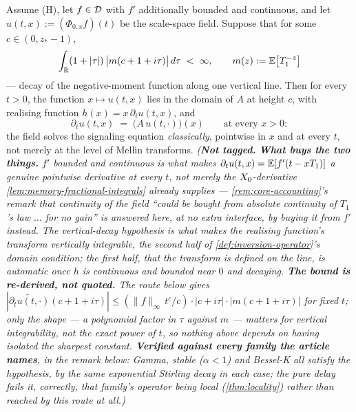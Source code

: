 \begin{corollary}\label{cor:signaling-classical}
Assume (H), let $f \in \mathcal{D}$ with $f'$ additionally bounded and continuous, and let
$u(t,x) := (\Phi_{0,x}f)(t)$ be the scale-space field. Suppose that for some $c \in (0,z_*-1)$,
\[
\int_{\mathbb{R}} (1+|\tau|)\,\bigl|m(c+1+i\tau)\bigr|\,d\tau \;<\; \infty, \qquad m(z) := \mathbb{E}\bigl[T_1^{-z}\bigr]
\]
--- decay of the negative-moment function along one vertical line. Then for every $t > 0$, the
function $x \mapsto u(t,x)$ lies in the domain of $A$ at height $c$, with realising function
$h(x) = x\,\partial_t u(t,x)$, and
\[
\partial_t u(t,x) \;=\; \bigl(A\,u(t,\cdot)\bigr)(x) \qquad \text{at every } x > 0:
\]
the field solves the signaling equation \emph{classically}, pointwise in $x$ and at every $t$, not
merely at the level of Mellin transforms.
\statusT\quad\emph{(\textbf{Not tagged.} \textbf{What buys the two things.} $f'$ bounded and
continuous is what makes $\partial_t u(t,x) = \mathbb{E}[f'(t-xT_1)]$ a genuine \emph{pointwise}
derivative at every $t$, not merely the $X_0$-derivative \ref{lem:memory-fractional-integrals}
already supplies --- \ref{rem:core-accounting}'s remark that continuity of the field ``could be
bought from absolute continuity of $T_1$'s law $\ldots$ for no gain'' is answered here, at no
extra interface, by buying it from $f'$ instead. The vertical-decay hypothesis is what makes the
realising function's transform \emph{vertically integrable}, the second half of
\ref{def:inversion-operator}'s domain condition; the first half, that the transform is defined on
the line, is automatic once $h$ is continuous and bounded near $0$ and decaying.
\textbf{The bound is re-derived, not quoted.} The route below gives
$|\widetilde{\partial_t u(t,\cdot)}(c+1+i\tau)| \le (\|f\|_\infty\,t^c/c)\cdot|c+i\tau|\cdot
|m(c+1+i\tau)|$ for fixed $t$; only the \emph{shape} --- a polynomial factor in $\tau$ against $m$
--- matters for vertical integrability, not the exact power of $t$, so nothing above depends on
having isolated the sharpest constant.
\textbf{Verified against every family the article names}, in the remark below: Gamma, stable
($\alpha<1$) and Bessel-K all satisfy the hypothesis, by the same exponential Stirling decay in
each case; the pure delay fails it, correctly, that family's operator being local
(\ref{thm:locality}) rather than reached by this route at all.)}
\end{corollary}

